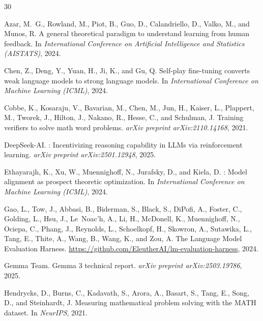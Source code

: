\documentclass{article}
\begin{document}
\begin{thebibliography}{30}

Azar, M.~G., Rowland, M., Piot, B., Guo, D., Calandriello, D., Valko, M., and Munos, R.
\newblock A general theoretical paradigm to understand learning from human feedback.
\newblock In \emph{International Conference on Artificial Intelligence and Statistics (AISTATS)}, 2024.

Chen, Z., Deng, Y., Yuan, H., Ji, K., and Gu, Q.
\newblock Self-play fine-tuning converts weak language models to strong language models.
\newblock In \emph{International Conference on Machine Learning (ICML)}, 2024.

Cobbe, K., Kosaraju, V., Bavarian, M., Chen, M., Jun, H., Kaiser, L., Plappert, M., Tworek, J., Hilton, J., Nakano, R., Hesse, C., and Schulman, J.
\newblock Training verifiers to solve math word problems.
\newblock \emph{arXiv preprint arXiv:2110.14168}, 2021.

DeepSeek-AI.
: Incentivizing reasoning capability in {LLMs} via reinforcement learning.
\newblock \emph{arXiv preprint arXiv:2501.12948}, 2025.

Ethayarajh, K., Xu, W., Muennighoff, N., Jurafsky, D., and Kiela, D.
: Model alignment as prospect theoretic optimization.
\newblock In \emph{International Conference on Machine Learning (ICML)}, 2024.

Gao, L., Tow, J., Abbasi, B., Biderman, S., Black, S., DiPofi, A., Foster, C., Golding, L., Hsu, J., Le~Noac'h, A., Li, H., McDonell, K., Muennighoff, N., Ociepa, C., Phang, J., Reynolds, L., Schoelkopf, H., Skowron, A., Sutawika, L., Tang, E., Thite, A., Wang, B., Wang, K., and Zou, A.
\newblock The Language Model Evaluation Harness.
\newblock \url{https://github.com/EleutherAI/lm-evaluation-harness}, 2024.

Gemma Team.
\newblock Gemma 3 technical report.
\newblock \emph{arXiv preprint arXiv:2503.19786}, 2025.

Hendrycks, D., Burns, C., Kadavath, S., Arora, A., Basart, S., Tang, E., Song, D., and Steinhardt, J.
\newblock Measuring mathematical problem solving with the {MATH} dataset.
\newblock In \emph{NeurIPS}, 2021.


\end{thebibliography}
\end{document}

